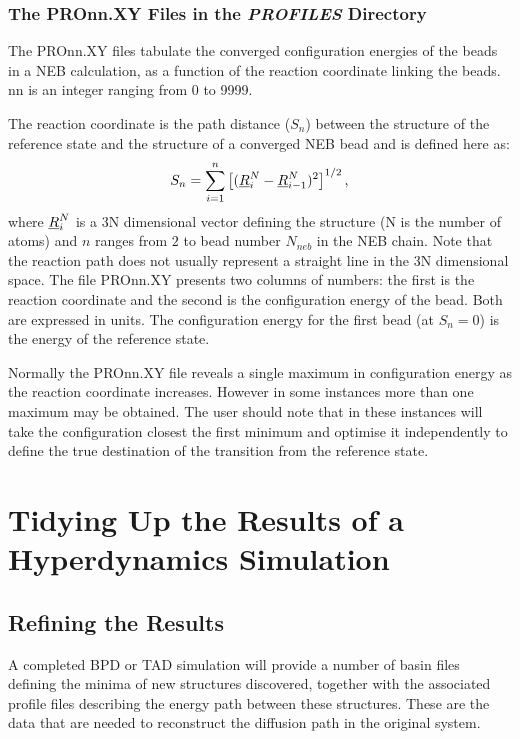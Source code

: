 \subsubsection{The PROnn.XY Files in the {\em PROFILES} Directory}

The PROnn.XY files tabulate the converged configuration energies of the
beads in a NEB calculation, as a function of the reaction coordinate
linking the beads. nn is an integer ranging from 0 to 9999.

The reaction coordinate is the path distance ($S_{n}$) between the
structure of the reference state and the structure of a converged NEB
bead and is defined here as: 
\begin{equation}
S_{n}=\sum_{i=1}^{n}\left [(\mbox{$\underline{R}$}^{N}_{i}-\mbox{$\underline{R}$}^{N}_{i-1})^{2}\right ]^{1/2},
\end{equation}
where $\mbox{$\underline{R}$}^{N}_{i}$ is a 3N dimensional vector defining the structure
(N is the number of atoms) and $n$ ranges from $2$ to bead number
$N_{neb}$ in the NEB chain.  Note that the reaction path does not
usually represent a straight line in the 3N dimensional space.  The
file PROnn.XY presents two columns of numbers: the first is the
reaction coordinate and the second is the configuration energy of the
bead. Both are expressed in \D{} units. The configuration energy for the
first bead (at $S_{n}=0$) is the energy of the reference state.

Normally the PROnn.XY file reveals a single maximum in configuration
energy as the reaction coordinate increases. However in some instances
more than one maximum may be obtained. The user should note that in these
instances \D{} will take the configuration closest the first minimum
and optimise it independently to define the true destination of the
transition from the reference state.

\section{Tidying Up the Results of a Hyperdynamics Simulation}
\label{tidyup}

\subsection{Refining the Results}

A completed BPD or TAD simulation will provide a number of basin files
defining the minima of new structures discovered, together with the
associated profile files describing the energy path between these
structures. These are the data that are needed to reconstruct the
diffusion path in the original system.

